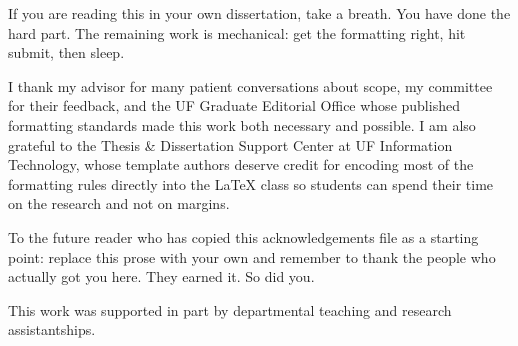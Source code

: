 
If you are reading this in your own dissertation, take a breath. You
have done the hard part. The remaining work is mechanical: get the
formatting right, hit submit, then sleep.

I thank my advisor for many patient conversations about scope, my
committee for their feedback, and the UF Graduate Editorial Office
whose published formatting standards made this work both necessary
and possible. I am also grateful to the Thesis \& Dissertation Support
Center at UF Information Technology, whose template authors deserve
credit for encoding most of the formatting rules directly into the
LaTeX class so students can spend their time on the research and not
on margins.

To the future reader who has copied this acknowledgements file as a
starting point: replace this prose with your own and remember to thank
the people who actually got you here. They earned it. So did you.

This work was supported in part by departmental teaching and research
assistantships.
